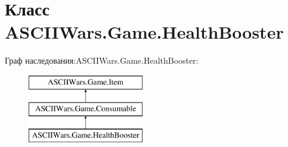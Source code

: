 \hypertarget{class_a_s_c_i_i_wars_1_1_game_1_1_health_booster}{}\section{Класс A\+S\+C\+I\+I\+Wars.\+Game.\+Health\+Booster}
\label{class_a_s_c_i_i_wars_1_1_game_1_1_health_booster}
Граф наследования\+:A\+S\+C\+I\+I\+Wars.\+Game.\+Health\+Booster\+:\begin{figure}[H]
\begin{center}
\leavevmode
\includegraphics[height=3.000000cm]{class_a_s_c_i_i_wars_1_1_game_1_1_health_booster}
\end{center}
\end{figure}

